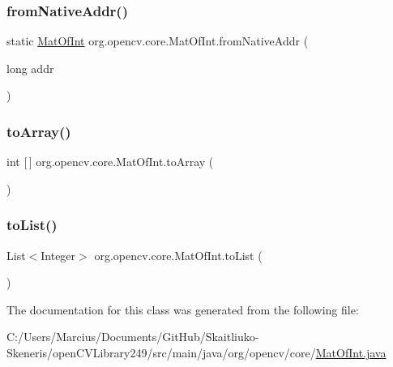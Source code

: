 \mbox{\label{classorg_1_1opencv_1_1core_1_1_mat_of_int_ae564d3eb9dfba05e08486051b3d44878}} 
\subsubsection{\texorpdfstring{from\+Native\+Addr()}{fromNativeAddr()}}
{\footnotesize\ttfamily static \mbox{\hyperlink{classorg_1_1opencv_1_1core_1_1_mat_of_int}{Mat\+Of\+Int}} org.\+opencv.\+core.\+Mat\+Of\+Int.\+from\+Native\+Addr (\begin{DoxyParamCaption}\item[{long}]{addr }\end{DoxyParamCaption})\hspace{0.3cm}{\ttfamily [static]}}

\mbox{\label{classorg_1_1opencv_1_1core_1_1_mat_of_int_adaf6c489a50ae64dc8f1f2a92f5c3fc0}} 
\subsubsection{\texorpdfstring{to\+Array()}{toArray()}}
{\footnotesize\ttfamily int \mbox{[}$\,$\mbox{]} org.\+opencv.\+core.\+Mat\+Of\+Int.\+to\+Array (\begin{DoxyParamCaption}{ }\end{DoxyParamCaption})}

\mbox{\label{classorg_1_1opencv_1_1core_1_1_mat_of_int_a5000394652df3fbbf922978a1d4a2bc7}} 
\subsubsection{\texorpdfstring{to\+List()}{toList()}}
{\footnotesize\ttfamily List$<$Integer$>$ org.\+opencv.\+core.\+Mat\+Of\+Int.\+to\+List (\begin{DoxyParamCaption}{ }\end{DoxyParamCaption})}



The documentation for this class was generated from the following file\+:\begin{DoxyCompactItemize}
\item 
C\+:/\+Users/\+Marcius/\+Documents/\+Git\+Hub/\+Skaitliuko-\/\+Skeneris/open\+C\+V\+Library249/src/main/java/org/opencv/core/\mbox{\hyperlink{_mat_of_int_8java}{Mat\+Of\+Int.\+java}}\end{DoxyCompactItemize}
